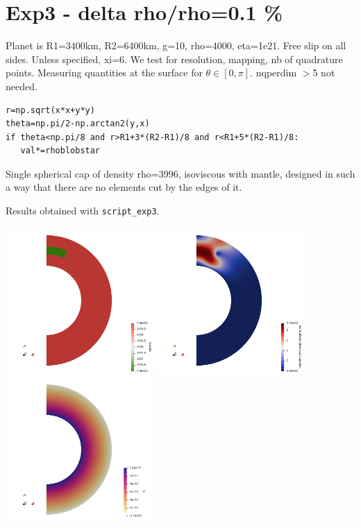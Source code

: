 \newpage
\section{Exp3 - delta rho/rho=0.1 \%}

Planet is R1=3400km, R2=6400km, g=10, rho=4000, eta=1e21.
Free slip on all sides. Unless specified, xi=6.
We test for resolution, mapping, nb of quadrature points.
Measuring quantities at the surface for $\theta\in[0,\pi]$.
nqperdim $>$5  not needed. 

\begin{lstlisting}
r=np.sqrt(x*x+y*y)
theta=np.pi/2-np.arctan2(y,x)
if theta<np.pi/8 and r>R1+3*(R2-R1)/8 and r<R1+5*(R2-R1)/8:
   val*=rhoblobstar
\end{lstlisting}

Single spherical cap of density rho=3996, isoviscous with mantle,
designed in such a way that there are no elements cut by the edges of it.

Results obtained with {\tt script\_exp3}.

\begin{center}
\includegraphics[width=5.6cm]{python_codes/fieldstone_152/RESULTS/exp3/rho}
\includegraphics[width=5.6cm]{python_codes/fieldstone_152/RESULTS/exp3/vel}
\includegraphics[width=5.6cm]{python_codes/fieldstone_152/RESULTS/exp3/press}
\end{center}

